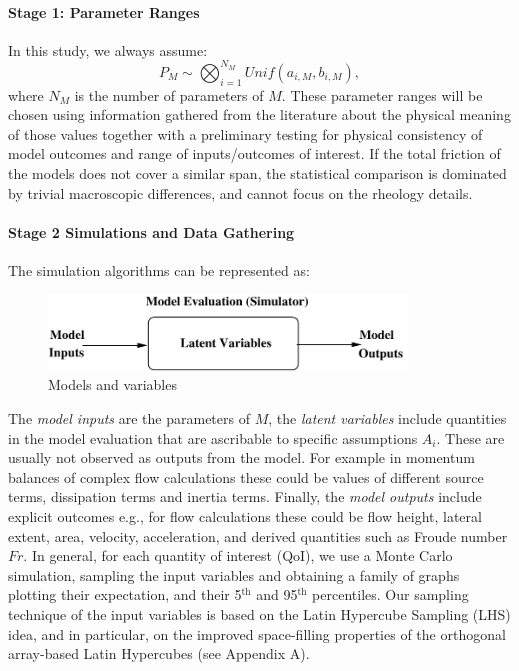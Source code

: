 \documentclass{article}
\begin{document}
\paragraph{Stage 1: Parameter Ranges} In this study, we always assume:
$$P_M\sim \bigotimes_{i=1}^{N_M} Unif(a_{i,M},b_{i,M}),$$
where $N_M$ is the number of parameters of $M$. These parameter ranges will be chosen using information gathered from the literature about the physical meaning of those values together with a preliminary testing for physical consistency of model outcomes and range of inputs/outcomes of interest. If the total friction of the models does not cover a similar span, the statistical comparison is dominated by trivial macroscopic differences, and cannot focus on the rheology details.

\paragraph{Stage 2 Simulations and Data Gathering}
The simulation algorithms can be represented as:
\begin{figure}[H]
\centerline{\includegraphics[width=0.85\textwidth]{modelproc.pdf}}
\centering
\caption{Models and variables}
\end{figure}

The \emph{model inputs} are the parameters of $M$, the \emph{latent variables} include quantities in the model evaluation that are ascribable to specific assumptions $A_i$. These are usually not observed as outputs from the model. For example in momentum balances of complex flow calculations these could be values of different source terms, dissipation terms and inertia terms. Finally, the \emph{model outputs} include explicit outcomes e.g., for flow calculations these could be flow height, lateral extent, area, velocity, acceleration, and derived quantities such as Froude number $Fr$. In general, for each quantity of interest (QoI), we use a Monte Carlo simulation, sampling the input variables and obtaining a family of graphs plotting their expectation, and their 5$^{\mathrm{th}}$ and 95$^{\mathrm{th}}$ percentiles. Our sampling technique of the input variables is based on the Latin Hypercube Sampling (LHS) idea, and in particular, on the improved space-filling properties of the orthogonal array-based Latin Hypercubes (see Appendix A).
\end{document}
